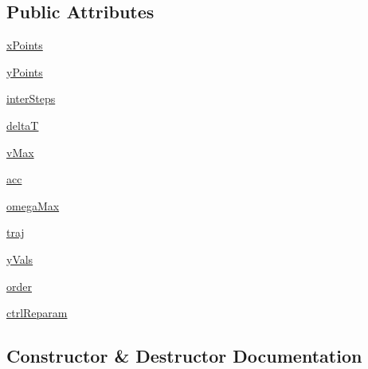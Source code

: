 \subsection*{Public Attributes}
\begin{DoxyCompactItemize}
\item 
\hyperlink{classcmd__TTB_1_1trajFactory_1_1TrajFactory_a6dd492eb38a8d0551974c7c03ccda61e}{x\+Points}
\item 
\hyperlink{classcmd__TTB_1_1trajFactory_1_1TrajFactory_ad94e5ab21d61d2abdb570c2ac00cfd34}{y\+Points}
\item 
\hyperlink{classcmd__TTB_1_1trajFactory_1_1TrajFactory_a17391e139222a91451f87e07e96f0952}{inter\+Steps}
\item 
\hyperlink{classcmd__TTB_1_1trajFactory_1_1TrajFactory_a663f339258fb25b0f2648ea059798752}{deltaT}
\item 
\hyperlink{classcmd__TTB_1_1trajFactory_1_1TrajFactory_a1155273084f5a5639af322d21467c44e}{v\+Max}
\item 
\hyperlink{classcmd__TTB_1_1trajFactory_1_1TrajFactory_af2a193ef91148ba2d63378e55869b214}{acc}
\item 
\hyperlink{classcmd__TTB_1_1trajFactory_1_1TrajFactory_a236b5b0b56949f54b45a6f4fb7ae1153}{omega\+Max}
\item 
\hyperlink{classcmd__TTB_1_1trajFactory_1_1TrajFactory_aa2eb324765a12b2671934281358cd0ec}{traj}
\item 
\hyperlink{classcmd__TTB_1_1trajFactory_1_1TrajFactory_a37b4adbe457a79a1cffd38b5022fbc3b}{y\+Vals}
\item 
\hyperlink{classcmd__TTB_1_1trajFactory_1_1TrajFactory_a3a21023c80037375f39420be4c5d2097}{order}
\item 
\hyperlink{classcmd__TTB_1_1trajFactory_1_1TrajFactory_ab64f2aea61f026ee7c20bd223599dd35}{ctrl\+Reparam}
\end{DoxyCompactItemize}


\subsection{Constructor \& Destructor Documentation}
